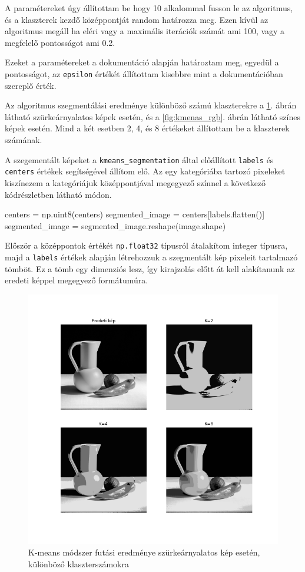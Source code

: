  A paramétereket úgy állítottam be hogy 10 alkalommal fusson le az algoritmus, és a klaszterek kezdő középpontját random határozza meg. Ezen kívül az algoritmus megáll ha eléri vagy a maximális iterációk számát ami 100, vagy a megfelelő pontosságot ami 0.2.

 Ezeket a paramétereket a \cite{kmeans_opencv} dokumentáció alapján határoztam meg, egyedül a pontosságot, az \texttt{epsilon} értékét állítottam kisebbre mint a dokumentációban szereplő érték.
 
 Az algoritmus szegmentálási eredménye különböző számú klaszterekre a \ref{fig:kmenas_grayscale}. ábrán látható szürkeárnyalatos képek esetén, és a \ref{fig:kmenas_rgb}. ábrán látható színes képek esetén. Mind a két esetben 2, 4, és 8 értékeket állítottam be a klaszterek számának. 
 
 A szegementált képeket a \texttt{kmeans\_segmentation} által előállított \texttt{labels} és \texttt{centers} értékek segítségével állítom elő. Az egy kategóriába tartozó pixeleket kiszínezem a kategóriájuk középpontjával megegyező színnel a következő kódrészletben látható módon.
 
\begin{python}
centers = np.uint8(centers)
segmented_image = centers[labels.flatten()]
segmented_image = segmented_image.reshape(image.shape)
\end{python}

Először a középpontok értékét \texttt{np.float32} típusról átalakítom integer típusra, majd a \texttt{labels} értékek alapján létrehozzuk a szegmentált kép pixeleit tartalmazó tömböt. Ez a tömb egy dimenziós lesz, így kirajzolás előtt át kell alakítanunk az eredeti képpel megegyező formátumúra.

\begin{figure}[h]
\centering
\includegraphics[scale=0.6]{images/kmeans_grayscale.png}
\caption{K-means módszer futási eredménye szürkeárnyalatos kép esetén, különböző klaszterszámokra}
\label{fig:kmenas_grayscale}
\end{figure}


